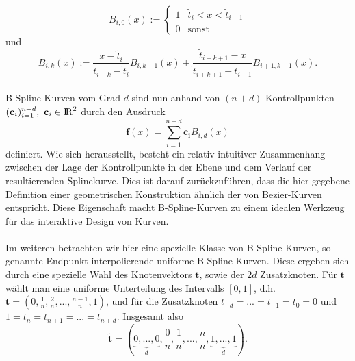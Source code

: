 \[
B_{i,0}(x) := \begin{cases} 1& \tilde{t}_i<x<\tilde{t}_{i+1} \\ 0& \text{sonst} \end{cases}
\]
und
\[
B_{i,k}(x) := \frac{x-\tilde{t}_i}{\tilde{t}_{i+k}-\tilde{t}_i}B_{i,k-1}(x) + \frac{\tilde{t}_{i+k+1}-x}{\tilde{t}_{i+k+1}-\tilde{t}_{i+1}}B_{i+1,k-1}(x).
\]
\\
%
B-Spline-Kurven vom Grad $d$ sind nun anhand von $(n+d)$ Kontrollpunkten $(\mathbf{c}_i)_{i=1}^{n+d},\ \mathbf{c}_i\in\R^2$ durch den Ausdruck
\[
\mathbf{f}(x)=\sum_{i=1}^{n+d}\mathbf{c_i}B_{i,d}(x)
\]
definiert. Wie sich herausstellt, besteht ein relativ intuitiver Zusammenhang zwischen der Lage der Kontrollpunkte in der Ebene und dem Verlauf der resultierenden Splinekurve. Dies ist darauf zurückzuführen, dass die hier gegebene Definition einer geometrischen Konstruktion ähnlich der von Bezier-Kurven entspricht. Diese Eigenschaft macht B-Spline-Kurven zu einem idealen Werkzeug für das interaktive Design von Kurven.\\
\\
Im weiteren betrachten wir hier eine spezielle Klasse von B-Spline-Kurven, so genannte Endpunkt-interpolierende uniforme B-Spline-Kurven. Diese ergeben sich durch eine spezielle Wahl des Knotenvektors $\mathbf{t}$, sowie der $2d$ Zusatzknoten. Für $\mathbf{t}$ wählt man eine uniforme Unterteilung des Intervalls $[0,1]$, d.h. $\mathbf{t}=(0,\frac{1}{n},\frac{2}{n},...,\frac{n-1}{n},1)$, und für die Zusatzknoten $t_{-d}=...=t_{-1}=t_0=0$ und $1=t_n=t_{n+1}=...=t_{n+d}$. Insgesamt also
\[
\mathbf{\tilde{t}}=(\underbrace{0,...,0}_{d},\frac{0}{n},\frac{1}{n},...,\frac{n}{n},\underbrace{1,...,1}_{d}).
\]
%
